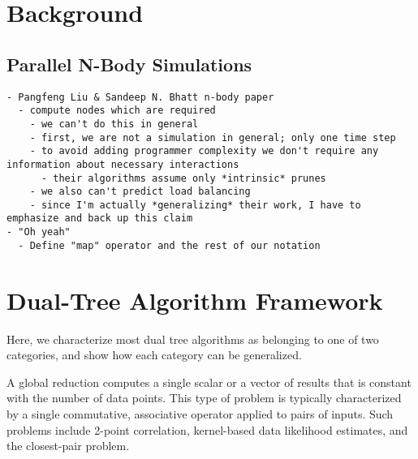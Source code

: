 \documentclass[times, 10pt,twocolumn]{article}
\begin{document}
%
%
%
%
%
%
%
%

\section{Background}

\subsection{Parallel N-Body Simulations}

\begin{verbatim}
- Pangfeng Liu & Sandeep N. Bhatt n-body paper
  - compute nodes which are required
    - we can't do this in general
    - first, we are not a simulation in general; only one time step
    - to avoid adding programmer complexity we don't require any information about necessary interactions
      - their algorithms assume only *intrinsic* prunes
    - we also can't predict load balancing
    - since I'm actually *generalizing* their work, I have to emphasize and back up this claim
- "Oh yeah"
  - Define "map" operator and the rest of our notation
\end{verbatim}

\section{Dual-Tree Algorithm Framework}

Here, we characterize most dual tree algorithms as belonging to one of two categories, and show how each category can be generalized.

A global reduction computes a single scalar or a vector of results that is constant with the number of data points.
This type of problem is typically characterized by a single commutative, associative operator applied to pairs of inputs.
Such problems include 2-point correlation, kernel-based data likelihood estimates, and the closest-pair problem.
\end{document}

